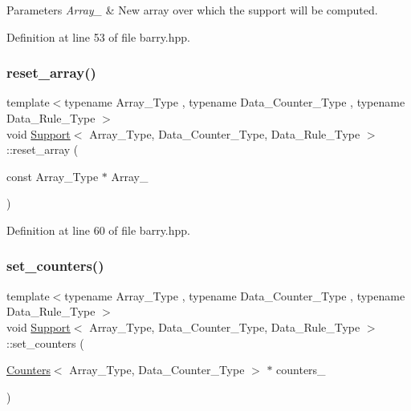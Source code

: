 \begin{DoxyParams}{Parameters}
{\em Array\+\_\+} & New array over which the support will be computed. \\
\hline
\end{DoxyParams}


Definition at line 53 of file barry.\+hpp.

\mbox{\label{classbarry_1_1_support_a6e39b22dfd1e0a0ceebf596c974f5326}} 
\subsubsection{\texorpdfstring{reset\+\_\+array()}{reset\_array()}\hspace{0.1cm}{\footnotesize\ttfamily [2/2]}}
{\footnotesize\ttfamily template$<$typename Array\+\_\+\+Type , typename Data\+\_\+\+Counter\+\_\+\+Type , typename Data\+\_\+\+Rule\+\_\+\+Type $>$ \\
void \hyperlink{classbarry_1_1_support}{Support}$<$ Array\+\_\+\+Type, Data\+\_\+\+Counter\+\_\+\+Type, Data\+\_\+\+Rule\+\_\+\+Type $>$\+::reset\+\_\+array (\begin{DoxyParamCaption}\item[{const Array\+\_\+\+Type $\ast$}]{Array\+\_\+ }\end{DoxyParamCaption})\hspace{0.3cm}{\ttfamily [inline]}}



Definition at line 60 of file barry.\+hpp.

\mbox{\label{classbarry_1_1_support_aef83474cda55c4ed52e313e8ed948b08}} 
\subsubsection{\texorpdfstring{set\+\_\+counters()}{set\_counters()}}
{\footnotesize\ttfamily template$<$typename Array\+\_\+\+Type , typename Data\+\_\+\+Counter\+\_\+\+Type , typename Data\+\_\+\+Rule\+\_\+\+Type $>$ \\
void \hyperlink{classbarry_1_1_support}{Support}$<$ Array\+\_\+\+Type, Data\+\_\+\+Counter\+\_\+\+Type, Data\+\_\+\+Rule\+\_\+\+Type $>$\+::set\+\_\+counters (\begin{DoxyParamCaption}\item[{\hyperlink{classbarry_1_1_counters}{Counters}$<$ Array\+\_\+\+Type, Data\+\_\+\+Counter\+\_\+\+Type $>$ $\ast$}]{counters\+\_\+ }\end{DoxyParamCaption})\hspace{0.3cm}{\ttfamily [inline]}}



